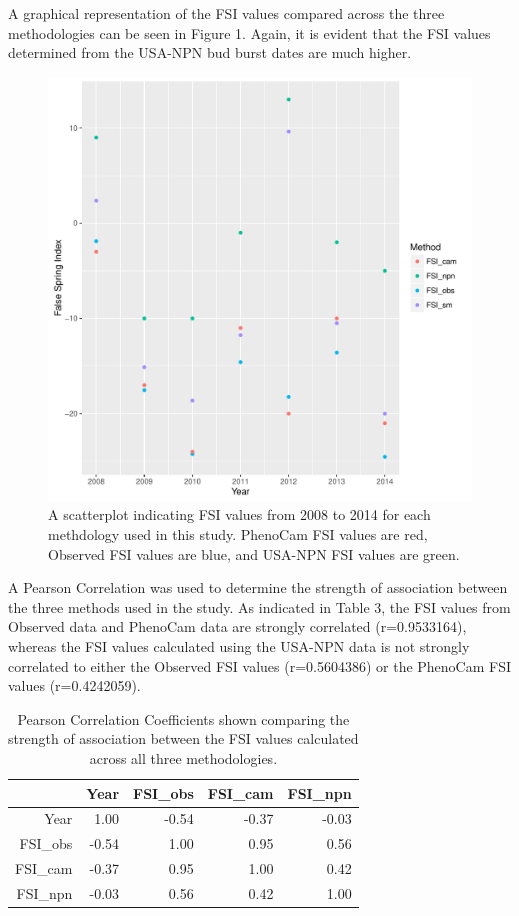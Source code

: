 \documentclass{article}\usepackage[]{graphicx}\usepackage[]{color}
\makeatletter
\def\maxwidth{ %
  \ifdim\Gin@nat@width>\linewidth
    \linewidth
  \else
    \Gin@nat@width
  \fi
}
\makeatother
\begin{document}
A graphical representation of the FSI values compared across the three methodologies can be seen in Figure 1.  Again, it is evident that the FSI values determined from the USA-NPN bud burst dates are much higher.

\begin{figure}
\includegraphics[width=\maxwidth]{figure/fsifig-1} \caption[A scatterplot indicating FSI values from 2008 to 2014 for each methdology used in this study]{A scatterplot indicating FSI values from 2008 to 2014 for each methdology used in this study. PhenoCam FSI values are red, Observed FSI values are blue, and USA-NPN FSI values are green.}\label{fig:fsifig}
\end{figure}



A Pearson Correlation was used to determine the strength of association between the three methods used in the study. As indicated in Table 3, the FSI values from Observed data and PhenoCam data are strongly correlated (r=0.9533164), whereas the FSI values calculated using the USA-NPN data is not strongly correlated to either the Observed FSI values (r=0.5604386) or the PhenoCam FSI values (r=0.4242059).

\begin{table}[ht]
\centering
\caption{Pearson Correlation Coefficients shown comparing the strength of association between the FSI values calculated across all three methodologies.} 
\begin{tabular}{rrrrr}
  \hline
 & Year & FSI\_obs & FSI\_cam & FSI\_npn \\ 
  \hline
Year & 1.00 & -0.54 & -0.37 & -0.03 \\ 
  FSI\_obs & -0.54 & 1.00 & 0.95 & 0.56 \\ 
  FSI\_cam & -0.37 & 0.95 & 1.00 & 0.42 \\ 
  FSI\_npn & -0.03 & 0.56 & 0.42 & 1.00 \\ 
   \hline
\end{tabular}
\end{table}
\end{document}

